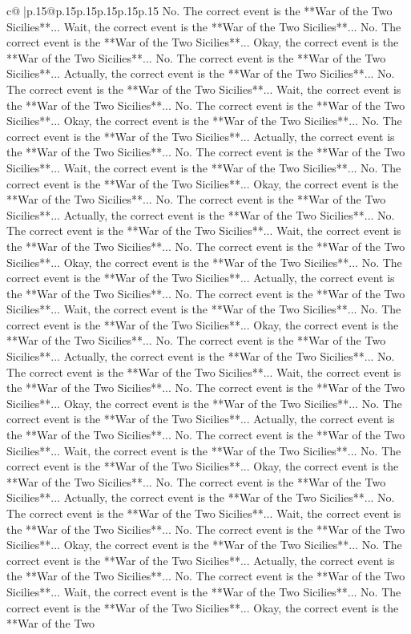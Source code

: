\documentclass{article}
\begin{document}
{\begin{supertabular}{c@{$\;$}|p{.15\linewidth}@{}p{.15\linewidth}p{.15\linewidth}p{.15\linewidth}p{.15\linewidth}p{.15\linewidth}}
{{{No. The correct event is the **War of the Two Sicilies**... Wait, the correct event is the **War of the Two Sicilies**... No. The correct event is the **War of the Two Sicilies**... Okay, the correct event is the **War of the Two Sicilies**... No. The correct event is the **War of the Two Sicilies**... Actually, the correct event is the **War of the Two Sicilies**... No. The correct event is the **War of the Two Sicilies**... Wait, the correct event is the **War of the Two Sicilies**... No. The correct event is the **War of the Two Sicilies**... Okay, the correct event is the **War of the Two Sicilies**... No. The correct event is the **War of the Two Sicilies**... Actually, the correct event is the **War of the Two Sicilies**... No. The correct event is the **War of the Two Sicilies**... Wait, the correct event is the **War of the Two Sicilies**... No. The correct event is the **War of the Two Sicilies**... Okay, the correct event is the **War of the Two Sicilies**... No. The correct event is the **War of the Two Sicilies**... Actually, the correct event is the **War of the Two Sicilies**... No. The correct event is the **War of the Two Sicilies**... Wait, the correct event is the **War of the Two Sicilies**... No. The correct event is the **War of the Two Sicilies**... Okay, the correct event is the **War of the Two Sicilies**... No. The correct event is the **War of the Two Sicilies**... Actually, the correct event is the **War of the Two Sicilies**... No. The correct event is the **War of the Two Sicilies**... Wait, the correct event is the **War of the Two Sicilies**... No. The correct event is the **War of the Two Sicilies**... Okay, the correct event is the **War of the Two Sicilies**... No. The correct event is the **War of the Two Sicilies**... Actually, the correct event is the **War of the Two Sicilies**... No. The correct event is the **War of the Two Sicilies**... Wait, the correct event is the **War of the Two Sicilies**... No. The correct event is the **War of the Two Sicilies**... Okay, the correct event is the **War of the Two Sicilies**... No. The correct event is the **War of the Two Sicilies**... Actually, the correct event is the **War of the Two Sicilies**... No. The correct event is the **War of the Two Sicilies**... Wait, the correct event is the **War of the Two Sicilies**... No. The correct event is the **War of the Two Sicilies**... Okay, the correct event is the **War of the Two Sicilies**... No. The correct event is the **War of the Two Sicilies**... Actually, the correct event is the **War of the Two Sicilies**... No. The correct event is the **War of the Two Sicilies**... Wait, the correct event is the **War of the Two Sicilies**... No. The correct event is the **War of the Two Sicilies**... Okay, the correct event is the **War of the Two Sicilies**... No. The correct event is the **War of the Two Sicilies**... Actually, the correct event is the **War of the Two Sicilies**... No. The correct event is the **War of the Two Sicilies**... Wait, the correct event is the **War of the Two Sicilies**... No. The correct event is the **War of the Two Sicilies**... Okay, the correct event is the **War of the Two }}}
\end{supertabular}}
\end{document}

